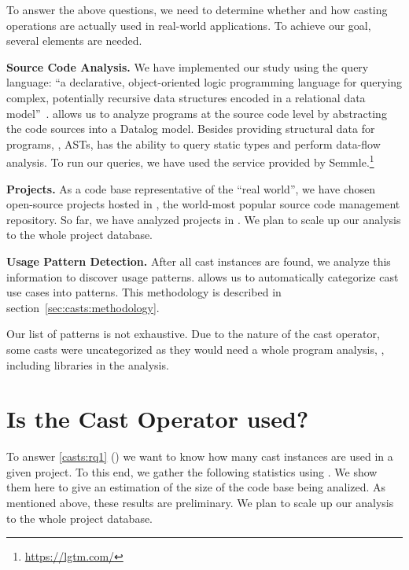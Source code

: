 To answer the above questions,
we need to determine whether and how casting operations are actually used in
real-world \java{} applications.
To achieve our goal, several elements are needed.

\textbf{Source Code Analysis.}
We have implemented our study using the \ql{} query language:
``a declarative, object-oriented logic programming language for querying complex, potentially recursive data structures encoded in a relational data model''~\citep{avgustinovQLObjectorientedQueries2016}.
\ql{} allows us to analyze programs at the source code level by abstracting the code sources into a Datalog model.
Besides providing structural data for programs, \ie{}, ASTs,
\ql{} has the ability to query static types and perform data-flow analysis.
To run our \ql{} queries, we have used the service provided by Semmle.\footnote{\url{https://lgtm.com/}} 

\textbf{Projects.} 
As a code base representative of the ``real world'',
we have chosen open-source projects hosted in 
\github{},
the world-most popular source code management repository.
So far, we have analyzed \nproject{} \java{} projects in \lgtm{}.
We plan to scale up our analysis to the whole \lgtm{} project database.

\textbf{Usage Pattern Detection.}
After all cast instances are found, we analyze this information to discover usage patterns.
\ql{} allows us to automatically categorize cast use cases into patterns.
This methodology is described in section~\ref{sec:casts:methodology}.

Our list of patterns is not exhaustive.
Due to the nature of the cast operator, some casts were uncategorized as they would need a whole program analysis, \eg{}, including libraries in the analysis.

\section{Is the Cast Operator used?}
\label{sec:casts:stats}

To answer \ref{casts:rq1} (\emph{\crqA}) we want to know how many cast instances are used in a given project.
To this end, we gather the following statistics using \ql{}.
We show them here to give an estimation of the size of the code base being analized.
As mentioned above, these results are preliminary.
We plan to scale up our analysis to the whole \lgtm{} project database.

